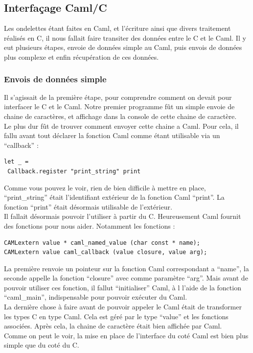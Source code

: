 \documentclass[a4paper,12pt]{article}
\begin{document}
	\subsection{Interfaçage Caml/C}
Les ondelettes étant faites en Caml, et l'écriture ainsi que divers traitement
réalisés en C, il nous fallait faire transiter des données entre le C et le
Caml. Il y eut plusieurs étapes, envoie de données simple au Caml, puis envois
de données plus complexe et enfin récupération de ces données.\\

		\subsubsection{Envois de données simple}
Il s'agissait de la première étape, pour comprendre comment on devait pour
interfacer le C et le Caml. Notre premier programme fût un simple envoie de
chaine de caractères, et affichage dans la console de cette chaine de
caractère.\\
Le plus dur fût de trouver comment envoyer cette chaine a Caml. Pour cela, il
fallu avant tout déclarer la fonction Caml comme étant utilisable via un
``callback'' :
\begin{verbatim}
let _ =
 Callback.register "print_string" print
\end{verbatim}
Comme vous pouvez le voir, rien de bien difficile à mettre en place,
``print\_string'' était l'identifiant extérieur de la fonction Caml ``print''.
La fonction ``print'' était désormais utilisable de l'extérieur.\\
Il fallait désormais pouvoir l'utiliser à partir du C. Heureusement Caml fournit
des fonctions pour nous aider. Notamment les fonctions :
\begin{verbatim}
CAMLextern value * caml_named_value (char const * name);
CAMLextern value caml_callback (value closure, value arg);
\end{verbatim}
La première renvoie un pointeur sur la fonction Caml correspondant a ``name'',
la seconde appelle la fonction ``closure'' avec comme paramètre ``arg''. Mais
avant de pouvoir utiliser ces fonction, il fallut ``initialiser'' Caml, à l
l'aide de la fonction ``caml\_main'', indispensable pour pouvoir exécuter du
Caml.\\
La dernière chose à faire avant de pouvoir appeler le Caml était de transformer
les types C en type Caml. Cela est géré par le type ``value'' et les fonctions
associées. Après cela, la chaine de caractère était bien affichée par Caml.\\
Comme on peut le voir, la mise en place de l'interface du coté Caml est bien
plus simple que du coté du C.\\
\end{document}
